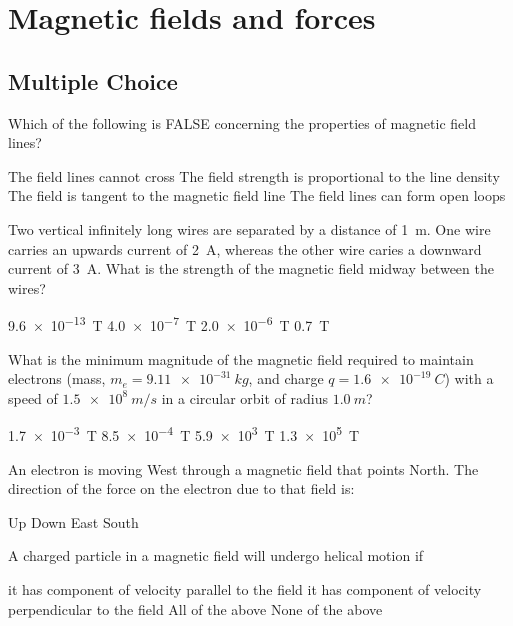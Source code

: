\section{Magnetic fields and forces}

\subsection{Multiple Choice}

\question Which of the following is FALSE concerning the properties of magnetic field lines?
\begin{checkboxes}
\choice The field lines cannot cross
\choice The field strength is proportional to the line density
\choice The field is tangent to the magnetic field line
\CorrectChoice The field lines can form open loops \correct
\end{checkboxes}

\question Two vertical infinitely long wires are separated by a distance of \SI{1}{m}. One wire carries an upwards current of \SI{2}{A}, whereas the other wire caries a downward current of \SI{3}{A}. What is the strength of the magnetic field midway between the wires?
\begin{checkboxes}
	\choice \SI{9.6e-13}{T}
	\choice \SI{4.0e-7}{T}
	\CorrectChoice \SI{2.0e-6}{T}
	\choice \SI{0.7}{T}
\end{checkboxes}

\question What is the minimum magnitude of the magnetic field required to maintain electrons (mass, $m_e=\SI{9.11e-31}{kg}$, and charge $q=\SI{1.6e-19}{C}$) with a speed of $\SI{1.5e8}{m/s}$ in a circular orbit of radius $\SI{1.0}{m}$?
\begin{checkboxes}
	\choice \SI{1.7e-3}{T}
	\CorrectChoice \SI{8.5e-4}{T}
	\choice \SI{5.9e3}{T}
	\choice \SI{1.3e5}{T}
\end{checkboxes}

\question An electron is moving West through a magnetic field that points North. The direction of the force on the electron due to that field is: 
\begin{checkboxes}
\CorrectChoice Up 
\choice Down
\choice East
\choice South
\end{checkboxes}

\question A charged particle in a magnetic field will undergo helical motion if
\begin{checkboxes}
\choice it has component of velocity parallel to the field 
\choice it has component of velocity perpendicular to the field 
\CorrectChoice All of the above
\choice None of the above
\end{checkboxes}

